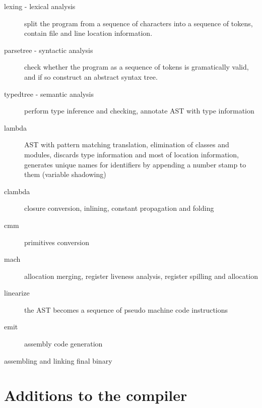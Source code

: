 \begin{description}
    \item[lexing - lexical analysis]
        split the program from a sequence of characters into a sequence of
        tokens, contain file and line location information.

    \item[parsetree - syntactic analysis]
        check whether the program as a sequence of tokens is gramatically valid, and if so
        construct an abstract syntax tree.

    \item[typedtree - semantic analysis]
        perform type inference and checking, annotate AST with type information

    \item[lambda]
        AST with pattern matching translation,
        elimination of classes and modules,
        discards type information and most of location information,
        generates unique names for identifiers by appending a number stamp to them
        (variable shadowing)

    \item[clambda]
        closure conversion, inlining, constant propagation and folding

    \item[cmm]
        primitives conversion %

    \item[mach]
        allocation merging, register liveness analysis, register spilling and allocation

    \item[linearize]
        the AST becomes a sequence of pseudo machine code instructions

    \item[emit] assembly code generation

    \item[assembling and linking final binary]
\end{description}


\clearpage

\section{Additions to the compiler}


